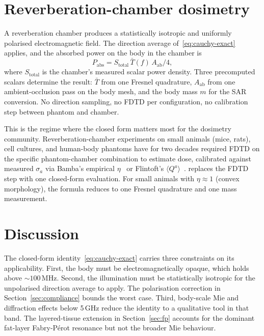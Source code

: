 \documentclass[journal,twocolumn,10pt]{IEEEtran}
\theoremstyle{plain}
\theoremstyle{remark}
\newcommand{\Aab}{A_{\mathrm{ab}}}
\newcommand{\Tbar}{\bar{T}}
\begin{document}
\section{Reverberation-chamber dosimetry}\label{sec:reverb}

A reverberation chamber produces a statistically isotropic and
uniformly polarised electromagnetic field. The direction average
of~\eqref{eq:cauchy-exact} applies, and the absorbed power on the
body in the chamber is
\begin{equation}\label{eq:reverb}
  P_{\mathrm{abs}} = S_{\mathrm{total}}\,\Tbar(f)\,\Aab/4,
\end{equation}
where $S_{\mathrm{total}}$ is the chamber's measured scalar power
density. Three precomputed scalars determine the result: $\Tbar$ from
one Fresnel quadrature, $\Aab$ from one ambient-occlusion pass on the
body mesh, and the body mass $m$ for the SAR conversion. No direction
sampling, no FDTD per configuration, no calibration step between
phantom and chamber.

This is the regime where the closed form matters most for the
dosimetry community. Reverberation-chamber experiments on small
animals (mice, rats), cell cultures, and human-body phantoms have for
two decades required FDTD on the specific phantom-chamber combination
to estimate dose, calibrated against measured $\sigma_a$ via Bamba's
empirical $\eta$~\cite{Bamba2014} or Flintoft's
$\langle Q^a\rangle$~\cite{Flintoft2014}.  replaces
the FDTD step with one closed-form evaluation. For small animals with
$\eta \approx 1$ (convex morphology), the formula reduces to one
Fresnel quadrature and one mass measurement.


\section{Discussion}\label{sec:disc}

The closed-form identity~\eqref{eq:cauchy-exact} carries three
constraints on its applicability. First, the body must be
electromagnetically opaque, which holds above $\sim 100\,$MHz.
Second, the illumination must be statistically isotropic for the
unpolarised direction average to apply. The polarisation correction
in Section~\ref{sec:compliance} bounds the worst case. Third,
body-scale Mie and diffraction effects below 5\,GHz reduce the
identity to a qualitative tool in that band. The layered-tissue
extension in Section~\ref{sec:fp} accounts for the dominant
fat-layer Fabry-P\'erot resonance but not the broader Mie behaviour.
\end{document}
